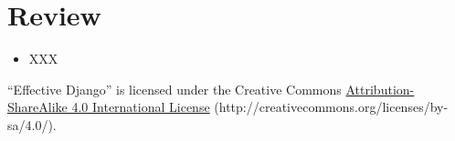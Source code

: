 \documentclass[letterpaper,10pt,english]{sphinxmanual}
\begin{document}
\section{Review}
\label{tutorial/authzn:review}\begin{itemize}
\item {} 
XXX

\end{itemize}

``Effective Django'' is licensed under the Creative Commons
\href{http://creativecommons.org/licenses/by-sa/4.0/}{Attribution-ShareAlike 4.0 International License} (http://creativecommons.org/licenses/by-sa/4.0/).



\renewcommand{\indexname}{Index}
\printindex
\end{document}
